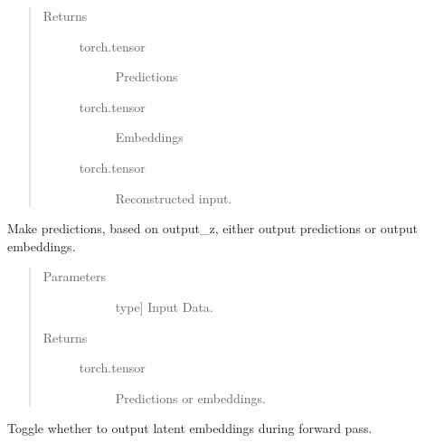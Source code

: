 \documentclass[letterpaper,10pt,english]{sphinxmanual}
\begin{document}
\begin{fulllineitems}
\begin{fulllineitems}
\begin{quote}
\begin{description}
\begin{description}
\end{description}

\item[{Returns}] \leavevmode\begin{description}
\item[{torch.tensor}] \leavevmode
Predictions

\item[{torch.tensor}] \leavevmode
Embeddings

\item[{torch.tensor}] \leavevmode
Reconstructed input.

\end{description}

\end{description}\end{quote}

\end{fulllineitems}


\begin{fulllineitems}
\label{\detokenize{index:methylnet.models.VAE_MLP.forward_predict}}
Make predictions, based on output\_z, either output predictions or output embeddings.
\begin{quote}\begin{description}
\item[{Parameters}] \leavevmode\begin{description}
\item[{}] \leavevmode{[}type{]}
Input Data.

\end{description}

\item[{Returns}] \leavevmode\begin{description}
\item[{torch.tensor}] \leavevmode
Predictions or embeddings.

\end{description}

\end{description}\end{quote}

\end{fulllineitems}


\begin{fulllineitems}
\label{\detokenize{index:methylnet.models.VAE_MLP.toggle_latent_z}}
Toggle whether to output latent embeddings during forward pass.

\end{fulllineitems}


\end{fulllineitems}
\end{document}

